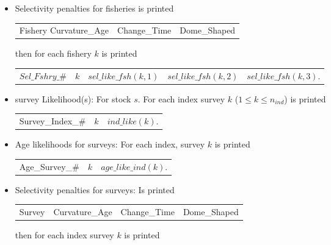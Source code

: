 \documentclass{article}
\begin{document}
\begin{itemize}
\begin{center}
\begin{tabular}{c c c}
        \end{tabular}
    \end{center}
    \item Selectivity penalties for fisheries is printed 
    \begin{center}
        \begin{tabular}{c c c}
           Fishery Curvature\_Age  & Change\_Time & Dome\_Shaped\\
        \end{tabular}
    \end{center}
    then for each fishery $k$ is printed
    \begin{center}
        \begin{tabular}{c c c c c}
          $Sel\_Fshry\_\#$   &  $k$ & $sel\_like\_fsh(k,1)$ & $sel\_like\_fsh(k,2)$ & $sel\_like\_fsh(k,3)$. \\
        \end{tabular}
    \end{center}
    \item survey Likelihood(s): For stock $s$. For each index survey $k$ ($1\leq k \leq n_{ind}$) is printed
    \begin{center}
        \begin{tabular}{c c c}
            Survey\_Index\_\# & $k$ & $ind\_like(k)$.\\
        \end{tabular}
    \end{center}
    \item Age likelihoods for surveys: For each index, survey $k$ is printed
    \begin{center}
        \begin{tabular}{c c c}
          Age\_Survey\_\#   & $k$ & $age\_like\_ind(k)$. \\
        \end{tabular}
    \end{center}
    \item Selectivity penalties for surveys: Is printed
    \begin{center}
        \begin{tabular}{c c c c}
          Survey   &  Curvature\_Age & Change\_Time  & Dome\_Shaped\\
        \end{tabular}
    \end{center}
    then for each index survey $k$ is printed
    \begin{center}
        \begin{tabular}{c c c c c}

\end{tabular}
\end{center}
\end{itemize}
\end{document}
